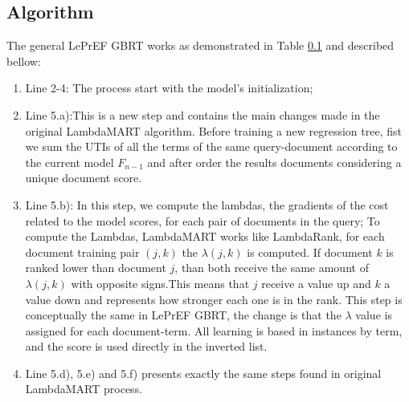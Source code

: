 \documentclass[preprint,12pt,3p]{elsarticle}
\begin{document}
\subsection{Algorithm}
\label{sec:algorithm} 

 The general LePrEF GBRT works as demonstrated in Table \ref{sec:algorithm} and described bellow:
 
 \begin{enumerate}
 \item{Line 2-4: The process start with the model's initialization;} 
 \item{Line 5.a):This is a new step and contains the main changes made in the original LambdaMART algorithm. Before training a new regression tree, fist we sum the UTIs of all the terms of the same query-document according to the current model $F_{n-1}$ and after order the results documents considering a unique document score.} 
 \item{Line 5.b): In this step, we compute the lambdas, the gradients of the cost related to the model scores, for each pair of documents in the query; To compute the Lambdas, LambdaMART works like LambdaRank, for each document training pair $(j,k)$ the $\lambda(j,k)$ is computed. If document $k$ is ranked lower than document $j$, than both receive the same amount of $\lambda(j,k)$ with opposite signs.This means that $j$ receive a value up and $k$ a value down and represents how stronger each one is in the rank. This step is conceptually the same in LePrEF GBRT, the change is that the $\lambda$ value is assigned for each document-term. All learning is based in instances by term, and the score is used directly in the inverted list.}
 \item{Line 5.d), 5.e) and 5.f) presents exactly the same steps found in original LambdaMART process.}
\end{enumerate}
\end{document}

